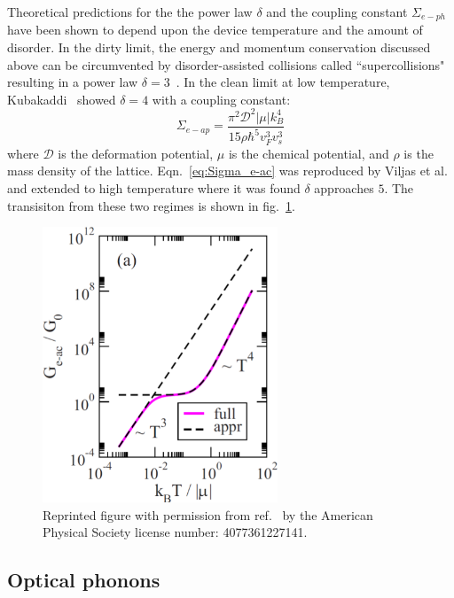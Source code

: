 Theoretical predictions for the the power law $\delta$ and the coupling constant $\Sigma_{e-ph}$ have been shown to depend upon the device temperature and the amount of disorder. In the dirty limit, the energy and momentum conservation discussed above can be circumvented by disorder-assisted collisions called ``supercollisions" resulting in a  power law $\delta=3$~\cite{song_disorder-assisted_2012}. In the clean limit at low temperature, Kubakaddi~\cite{kubakaddi_interaction_2009} showed $\delta = 4$ with a coupling constant:
\begin{equation}\label{eq:Sigma_e-ac}
\Sigma_{e-ap}=\frac{\pi^2\mathcal{D}^2\lvert\mu\rvert k_B^4}{15\rho\hbar^5v_F^3v_s^3}
\end{equation}
where $\mathcal{D}$ is the deformation potential, $\mu$ is the chemical potential, and $\rho$ is the mass density of the lattice.
Eqn.~\ref{eq:Sigma_e-ac} was reproduced by
Viljas et al.~\cite{viljas_electron-phonon_2010} and extended to high temperature where it was found $\delta$ approaches $5$. The transisiton from these two regimes is shown in fig.~\ref{fig:viljas2010}.
\begin{figure}
\centering
\includegraphics[width = 70mm]{figures/electronic_cooling/Viljas2010_conduction.png}
\caption{
Reprinted figure with permission from
ref.~\cite{viljas_electron-phonon_2010} by the American Physical Society license number: 4077361227141.}
\label{fig:viljas2010}
\end{figure}


\subsection{Optical phonons}

